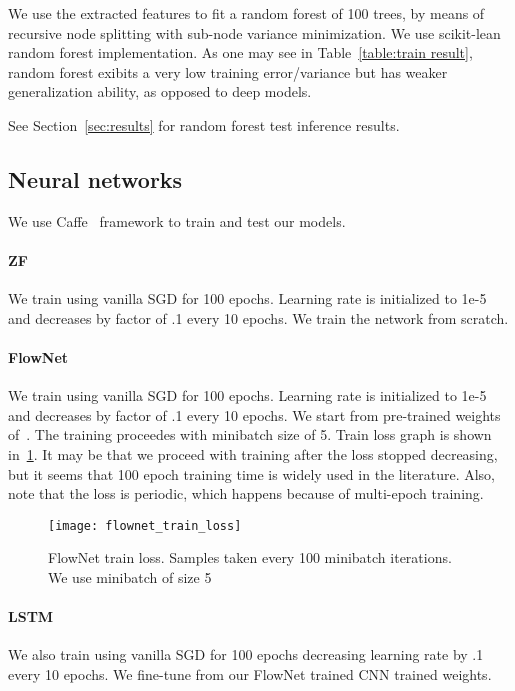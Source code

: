 We use the extracted features to fit a random forest of 100 trees, by
means of recursive node splitting with sub-node variance minimization.
We use scikit-lean~\cite{scikit-learn} random forest implementation.
As one may see in Table~\ref{table:train result}, random forest
exibits a very low training error/variance but has weaker
generalization ability, as opposed to deep models.

See Section~\ref{sec:results} for random forest test inference
results.

\subsection{Neural networks}

We use Caffe~\cite{jia2014caffe} framework to train and test our
models.
\paragraph{ZF} We train using vanilla SGD for 100 epochs. Learning
rate is initialized to 1e-5 and decreases by factor of .1 every 10
epochs. We train the network from scratch.


\paragraph{FlowNet} We train using vanilla SGD for 100
epochs. Learning rate is initialized to 1e-5 and decreases by factor
of .1 every 10 epochs. We start from pre-trained weights
of~\cite{fischer2015flownet}. The training proceedes with minibatch
size of 5. Train loss graph is shown in~\ref{fig:flownet_train_loss}.
It may be that we proceed with training after the loss stopped
decreasing, but it seems that 100 epoch training time is widely used
in the literature.  Also, note that the loss is periodic, which
happens because of multi-epoch training.
\begin{figure}[!ht]
  \centering
  \texttt{[image: flownet\_train\_loss]}
  \caption{FlowNet train loss. Samples taken every 100 minibatch iterations.  We use minibatch of size 5}
  \label{fig:flownet_train_loss}
\end{figure}

\paragraph{LSTM} We also train using vanilla SGD for 100 epochs
decreasing learning rate by .1 every 10 epochs.  We fine-tune from our
FlowNet trained CNN trained weights.

